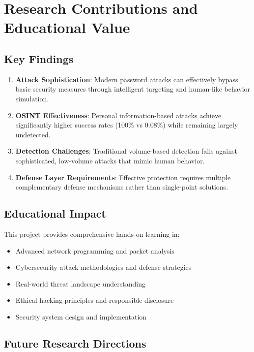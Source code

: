 \documentclass[12pt,a4paper]{article}
\begin{document}
\section{Research Contributions and Educational Value}

\subsection{Key Findings}

\begin{enumerate}
    \item \textbf{Attack Sophistication}: Modern password attacks can effectively bypass basic security measures through intelligent targeting and human-like behavior simulation.
    
    \item \textbf{OSINT Effectiveness}: Personal information-based attacks achieve significantly higher success rates (100\% vs 0.08\%) while remaining largely undetected.
    
    \item \textbf{Detection Challenges}: Traditional volume-based detection fails against sophisticated, low-volume attacks that mimic human behavior.
    
    \item \textbf{Defense Layer Requirements}: Effective protection requires multiple complementary defense mechanisms rather than single-point solutions.
\end{enumerate}

\subsection{Educational Impact}

This project provides comprehensive hands-on learning in:

\begin{itemize}
    \item Advanced network programming and packet analysis
    \item Cybersecurity attack methodologies and defense strategies
    \item Real-world threat landscape understanding
    \item Ethical hacking principles and responsible disclosure
    \item Security system design and implementation
\end{itemize}

\subsection{Future Research Directions}
\end{document}
